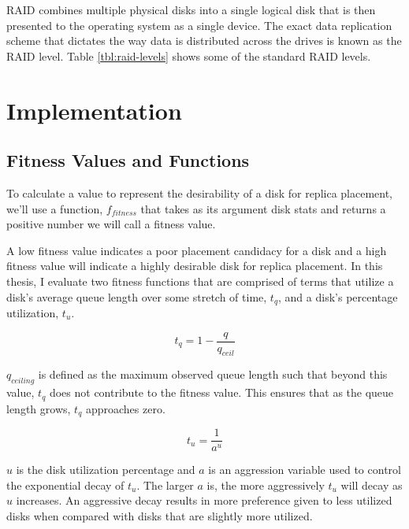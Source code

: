 \documentclass[12pt]{article}
\begin{document}
  RAID combines multiple physical disks into a single logical disk that is then
  presented to the operating system as a single device. The exact data
  replication scheme that dictates the way data is distributed across the
  drives is known as the RAID level. Table \ref{tbl:raid-levels} shows some of
  the standard RAID levels.



\newpage
\FloatBarrier
\section{Implementation}

  \subsection{Fitness Values and Functions}

  To calculate a value to represent the desirability of a disk for replica
  placement, we'll use a function, $f_{fitness}$ that takes as its argument
  disk stats and returns a positive number we will call a fitness value.

  
  A low fitness value indicates a poor placement candidacy for a disk and a
  high fitness value will indicate a highly desirable disk for replica
  placement. In this thesis, I evaluate two fitness functions that are
  comprised of terms that utilize a disk's average queue length over some
  stretch of time, $t_{q}$, and a disk's percentage utilization, $t_{u}$.

  \begin{equation}
    t_{q} = 1 - \frac{q}{q_{ceil}}
  \end{equation}

  $q_{ceiling}$ is defined as the maximum observed queue length such that
  beyond this value, $t_{q}$ does not contribute to the fitness
  value. This ensures that as the queue length grows, $t_{q}$
  approaches zero. 

  \begin{equation}
    t_{u} = \frac{1}{a^{u}}
  \end{equation}

  $u$ is the disk utilization percentage and $a$ is an aggression variable used
  to control the exponential decay of $t_{u}$. The larger $a$ is, the
  more aggressively $t_{u}$ will decay as $u$ increases. An
  aggressive decay results in more preference given to less utilized disks when
  compared with disks that are slightly more utilized.
\end{document}
